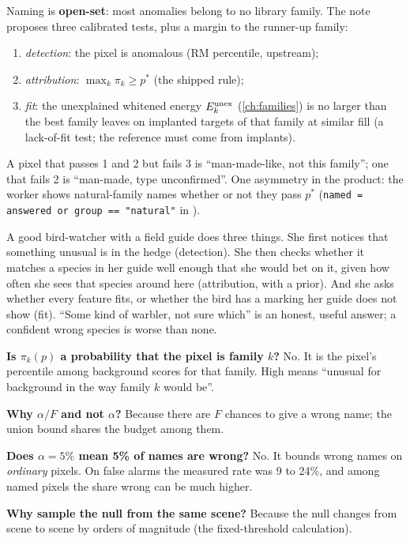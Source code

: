 \documentclass[11pt,a4paper,oneside,openany]{book}
\begin{document}
Naming is \textbf{open-set}: most anomalies belong to no library family. The note proposes three calibrated tests, plus a margin to the runner-up family:
\begin{enumerate}
\item \emph{detection}: the pixel is anomalous (RM percentile, upstream);
\item \emph{attribution}: $\max_k\pi_k\ge p^\ast$ (the shipped rule);
\item \emph{fit}: the unexplained whitened energy $E^{\rm unex}_k$ (\cref{ch:families}) is no larger than the best family leaves on implanted targets of that family at
  similar fill (a lack-of-fit test; the reference must come from implants).
\end{enumerate}
A pixel that passes 1 and 2 but fails 3 is ``man-made-like, not this family''; one that fails 2 is ``man-made, type unconfirmed''. One asymmetry in the product: the worker
shows natural-family names whether or not they pass $p^\ast$ (\texttt{named = answered or group == "natural"} in
).

\begin{analogy}
A good bird-watcher with a field guide does three things. She first notices that something unusual is in the hedge (detection). She then checks whether it matches a
species in her guide well enough that she would bet on it, given how often she sees that species around here (attribution, with a prior). And she asks whether every
feature fits, or whether the bird has a marking her guide does not show (fit). ``Some kind of warbler, not sure which'' is an honest, useful answer; a confident wrong
species is worse than none.
\end{analogy}

\begin{confusions}
\textbf{Is $\pi_k(p)$ a probability that the pixel is family $k$?} No. It is the pixel's percentile among background scores for that family. High means ``unusual for
background in the way family $k$ would be''.

\textbf{Why $\alpha/F$ and not $\alpha$?} Because there are $F$ chances to give a wrong name; the union bound shares the budget among them.

\textbf{Does $\alpha=5\%$ mean 5\% of names are wrong?} No. It bounds wrong names on \emph{ordinary} pixels. On false alarms the measured rate was 9 to 24\%, and among named
pixels the share wrong can be much higher.

\textbf{Why sample the null from the same scene?} Because the null changes from scene to scene by orders of magnitude (the fixed-threshold calculation).
\end{confusions}
\end{document}
